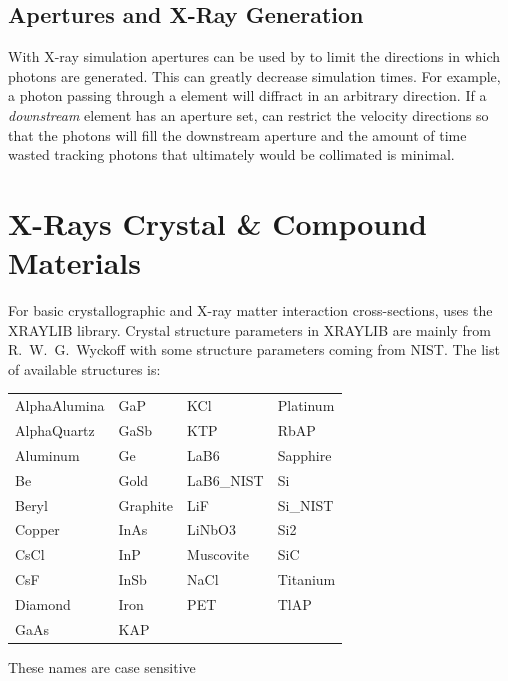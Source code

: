 \subsection{Apertures and X-Ray Generation}
\label{s:aper.x.ray}

With X-ray simulation apertures can be used by \bmad to limit the
directions in which photons are generated. This can greatly decrease
simulation times. For example, a photon passing through a
 element will diffract in an arbitrary
direction. If a {\em downstream} element has an aperture set, \bmad
can restrict the velocity directions so that the photons will fill the
downstream aperture and the amount of time wasted tracking photons
that ultimately would be collimated is minimal.

\section{X-Rays Crystal \& Compound Materials}
\label{s:cryst.list}

For basic crystallographic and X-ray matter interaction cross-sections,
\bmad uses the XRAYLIB\cite{b:xraylib} library. Crystal structure
parameters in XRAYLIB are mainly from R.~W.~G.~Wyckoff\cite{b:wyckoff}
with some structure parameters coming from NIST. The list of available
structures is:
\begin{center}
\begin{tabular}{llll}
AlphaAlumina & GaP       & KCl        & Platinum  \\
AlphaQuartz  & GaSb      & KTP        & RbAP      \\
Aluminum     & Ge        & LaB6       & Sapphire  \\
Be           & Gold      & LaB6_NIST  & Si        \\
Beryl        & Graphite  & LiF        & Si_NIST   \\
Copper       & InAs      & LiNbO3     & Si2       \\
CsCl         & InP       & Muscovite  & SiC       \\
CsF          & InSb      & NaCl       & Titanium  \\
Diamond      & Iron      & PET        & TlAP      \\
GaAs         & KAP       &            &           \\
\end{tabular}
\end{center}
These names are case sensitive

